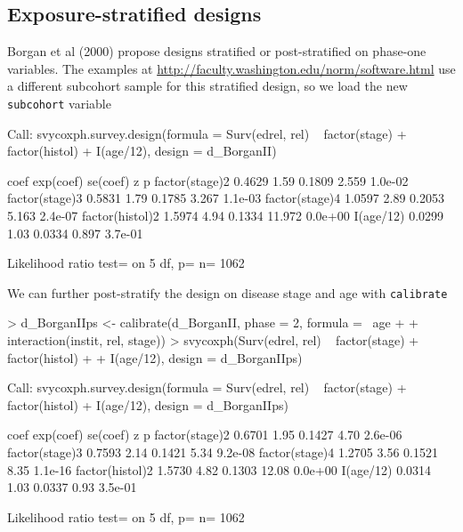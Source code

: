 \documentclass{article}
\begin{document}
\subsection*{Exposure-stratified designs}


Borgan et al (2000) propose designs stratified or post-stratified on
phase-one variables. The examples at
\url{http://faculty.washington.edu/norm/software.html} use a different
subcohort sample for this stratified design, so we load the new
\texttt{subcohort} variable
\begin{Schunk}
\begin{Soutput}
Call:
svycoxph.survey.design(formula = Surv(edrel, rel) ~ factor(stage) + 
    factor(histol) + I(age/12), design = d_BorganII)


                  coef exp(coef) se(coef)      z       p
factor(stage)2  0.4629      1.59   0.1809  2.559 1.0e-02
factor(stage)3  0.5831      1.79   0.1785  3.267 1.1e-03
factor(stage)4  1.0597      2.89   0.2053  5.163 2.4e-07
factor(histol)2 1.5974      4.94   0.1334 11.972 0.0e+00
I(age/12)       0.0299      1.03   0.0334  0.897 3.7e-01

Likelihood ratio test=  on 5 df, p=  n= 1062 
\end{Soutput}
\end{Schunk}


We can further post-stratify the design on disease stage and age with \texttt{calibrate}
\begin{Schunk}
\begin{Sinput}
> d_BorganIIps <- calibrate(d_BorganII, phase = 2, formula = ~age + 
+     interaction(instit, rel, stage))
> svycoxph(Surv(edrel, rel) ~ factor(stage) + factor(histol) + 
+     I(age/12), design = d_BorganIIps)
\end{Sinput}
\begin{Soutput}
Call:
svycoxph.survey.design(formula = Surv(edrel, rel) ~ factor(stage) + 
    factor(histol) + I(age/12), design = d_BorganIIps)


                  coef exp(coef) se(coef)     z       p
factor(stage)2  0.6701      1.95   0.1427  4.70 2.6e-06
factor(stage)3  0.7593      2.14   0.1421  5.34 9.2e-08
factor(stage)4  1.2705      3.56   0.1521  8.35 1.1e-16
factor(histol)2 1.5730      4.82   0.1303 12.08 0.0e+00
I(age/12)       0.0314      1.03   0.0337  0.93 3.5e-01

Likelihood ratio test=  on 5 df, p=  n= 1062 
\end{Soutput}
\end{Schunk}
\end{document}

